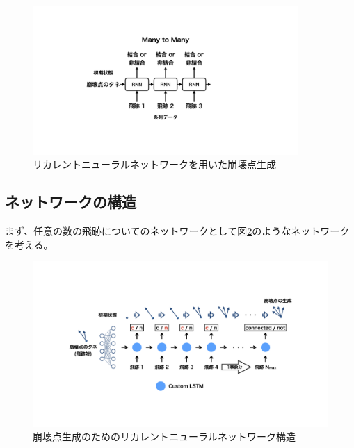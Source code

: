 \begin{figure}[htbp]
 \centering
 \includegraphics[trim = 200 150 200 150, width=0.9\textwidth, clip]{Figure/3Networks/3-4-0-1VertexProductionwithRNN.png}
 \caption{リカレントニューラルネットワークを用いた崩壊点生成}
 \label{3-4-0-1VertexProductionwithRNN}
\end{figure}


\subsection{ネットワークの構造} \label{Net:VLSTM:StructureofVLSTM}

まず、任意の数の飛跡についてのネットワークとして図\ref{3-4-1-1SimpleVLSTM}のようなネットワークを考える。

\begin{figure}[htbp]
 \centering
 \includegraphics[trim = 100 200 100 200, width=1.0\textwidth, clip]{Figure/3Networks/3-4-1-1SimpleVLSTM.png}
 \caption{崩壊点生成のためのリカレントニューラルネットワーク構造}
 \label{3-4-1-1SimpleVLSTM}
\end{figure}

